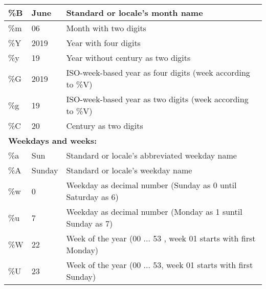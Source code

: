 \begin{itemize}
\begin{longtable}[c]{|lll|}
\multicolumn{1}{|l|}{\%B}            & \multicolumn{1}{l|}{June}              & Standard or locale's month name                                 \\ \hline
\multicolumn{1}{|l|}{\%m}            & \multicolumn{1}{l|}{06}                & Month with two digits                                           \\ \hline
\multicolumn{1}{|l|}{\%Y}            & \multicolumn{1}{l|}{2019}              & Year with four digits                                           \\ \hline
\multicolumn{1}{|l|}{\%y}            & \multicolumn{1}{l|}{19}                & Year without century as two digits                              \\ \hline
\multicolumn{1}{|l|}{\%G}            & \multicolumn{1}{l|}{2019}              & ISO-week-based year as four digits (week according to \%V)      \\ \hline
\multicolumn{1}{|l|}{\%g}            & \multicolumn{1}{l|}{19}                & ISO-week-based year as two digits (week according to \%V)       \\ \hline
\multicolumn{1}{|l|}{\%C}            & \multicolumn{1}{l|}{20}                & Century as two digits                                           \\ \hline
\multicolumn{3}{|l|}{\textbf{Weekdays and weeks:}}                                                                                              \\ \hline
\multicolumn{1}{|l|}{\%a}            & \multicolumn{1}{l|}{Sun}               & Standard or locale's abbreviated weekday name                   \\ \hline
\multicolumn{1}{|l|}{\%A}            & \multicolumn{1}{l|}{Sunday}            & Standard or locale's weekday name                               \\ \hline
\multicolumn{1}{|l|}{\%w}            & \multicolumn{1}{l|}{0}                 & Weekday as decimal number (Sunday as 0 until Saturday as 6)     \\ \hline
\multicolumn{1}{|l|}{\%u}            & \multicolumn{1}{l|}{7}                 & Weekday as decimal number (Monday as 1 suntil Sunday as 7)      \\ \hline
\multicolumn{1}{|l|}{\%W}            & \multicolumn{1}{l|}{22}                & Week of the year (00 ... 53 , week 01 starts with first Monday) \\ \hline
\multicolumn{1}{|l|}{\%U}            & \multicolumn{1}{l|}{23}                & Week of the year (00 ... 53, week 01 starts with first Sunday)  \\ \hline

\end{longtable}
\end{itemize}
